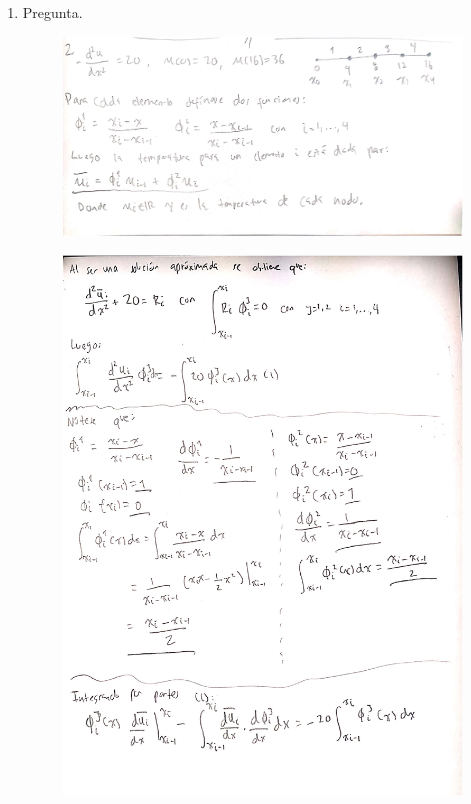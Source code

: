 \documentclass[fleqn]{article}
\begin{document}
\begin{enumerate}
\begin{enumerate}
\begin{figure}[H]
\begin{subfigure}[b]{0.45\textwidth}
                    \caption{Proyección de la aproximación 2D.}
                  \end{subfigure}
                \end{figure}
        \end{enumerate}
  \item Pregunta.
        \begin{figure}[H]
          \centering \includegraphics[scale=.3]{figs/21}
        \end{figure}
        \begin{figure}[H]
          \centering \includegraphics[scale=.8]{figs/22}

\end{figure}
\end{enumerate}
\end{document}
